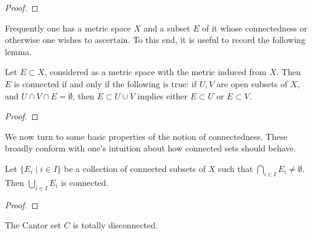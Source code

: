\begin{proof}

\end{proof}

Frequently one has a metric space $X$ and a subset $E$ of it whose connectedness or otherwise one wishes to ascertain. To this end, it is useful to record the following lemma.

\begin{lemma}
Let $E\subset X$, considered as a metric space with the metric induced from $X$. Then $E$ is connected if and only if the following is true: if $U,V$ are open subsets of $X$, and $U\cap V\cap E=\emptyset$, then $E\subset U\cup V$ implies either $E\subset U$ or $E\subset V$.
\end{lemma}

\begin{proof}

\end{proof}

We now turn to some basic properties of the notion of connectedness. These broadly conform with one's intuition about how connected sets should behave.

\begin{lemma}
Let $\{E_i\mid i\in I\}$ be a collection of connected subsets of $X$ such that $\bigcap_{i\in I}E_i\neq\emptyset$. Then $\bigcup_{i\in I}E_i$ is connected.
\end{lemma}

\begin{proof}

\end{proof}

\begin{proposition}
The Cantor set $C$ is totally disconnected.
\end{proposition}
\pagebreak

